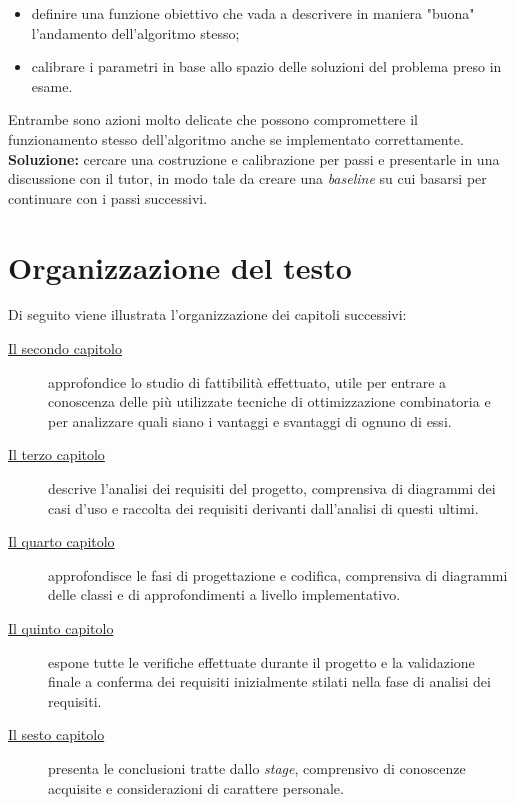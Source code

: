 \begin{enumerate}
    \begin{itemize}
        \item definire una funzione obiettivo che vada a descrivere in maniera "buona" l'andamento dell'algoritmo stesso;
        \item calibrare i parametri in base allo spazio delle soluzioni del problema preso in esame.
    \end{itemize}
    Entrambe sono azioni molto delicate che possono compromettere il funzionamento stesso dell'algoritmo anche
    se implementato correttamente.\\[0.2cm]
    \textbf{Soluzione:} cercare una costruzione e calibrazione per passi e presentarle in una discussione con il tutor,
    in modo tale da creare una \textit{baseline} su cui basarsi per continuare con i passi successivi.


\end{enumerate}

\noindent
\section{Organizzazione del testo}
\noindent Di seguito viene illustrata l'organizzazione dei capitoli successivi:
\begin{description}
    \item[{\hyperref[cap:studio-fattibilita]{Il secondo capitolo}}] 
    approfondice lo studio di fattibilità effettuato, utile per entrare a conoscenza
    delle più utilizzate tecniche di ottimizzazione combinatoria e per analizzare
    quali siano i vantaggi e svantaggi di ognuno di essi.
    
    \item[{\hyperref[cap:analisi-requisiti]{Il terzo capitolo}}]
    descrive l'analisi dei requisiti del progetto, comprensiva di diagrammi dei
    casi d'uso e raccolta dei requisiti derivanti dall'analisi di questi ultimi.
    
    \item[{\hyperref[cap:progettazione-codifica]{Il quarto capitolo}}]
    approfondisce le fasi di progettazione e codifica, comprensiva di diagrammi delle classi
    e di approfondimenti a livello implementativo.
    
    \item[{\hyperref[cap:verifica-validazione]{Il quinto capitolo}}]
    espone tutte le verifiche effettuate durante il progetto e la validazione
    finale a conferma dei requisiti inizialmente stilati nella fase di
    analisi dei requisiti.
    
    \item[{\hyperref[cap:conclusioni]{Il sesto capitolo}}]
    presenta le conclusioni tratte dallo \textit{stage}, comprensivo di conoscenze
    acquisite e considerazioni di carattere personale.
\end{description}

